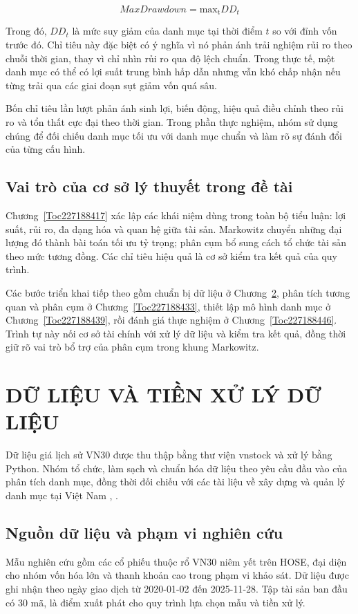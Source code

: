 \documentclass[12pt,a4paper,openany,oneside]{book}
\begin{document}
\begin{equation}\label{eq:theory-20}
Max Drawdown=\operatorname{{max_{t}}}D{D}_{t}
\end{equation}

Trong đó, \(D{D}_{t}\) là mức suy giảm của danh mục tại thời điểm \(t\) so với đỉnh vốn trước đó. Chỉ tiêu này đặc biệt có ý nghĩa vì nó phản ánh trải nghiệm rủi ro theo chuỗi thời gian, thay vì chỉ nhìn rủi ro qua độ lệch chuẩn. Trong thực tế, một danh mục có thể có lợi suất trung bình hấp dẫn nhưng vẫn khó chấp nhận nếu từng trải qua các giai đoạn sụt giảm vốn quá sâu.

Bốn chỉ tiêu lần lượt phản ánh sinh lợi, biến động, hiệu quả điều chỉnh theo rủi ro và tổn thất cực đại theo thời gian. Trong phần thực nghiệm, nhóm sử dụng chúng để đối chiếu danh mục tối ưu với danh mục chuẩn và làm rõ sự đánh đổi của từng cấu hình.

\section{Vai trò của cơ sở lý thuyết trong đề tài}\label{Toc227188425}
Chương~\ref{Toc227188417} xác lập các khái niệm dùng trong toàn bộ tiểu luận: lợi suất, rủi ro, đa dạng hóa và quan hệ giữa tài sản. Markowitz chuyển những đại lượng đó thành bài toán tối ưu tỷ trọng; phân cụm bổ sung cách tổ chức tài sản theo mức tương đồng. Các chỉ tiêu hiệu quả là cơ sở kiểm tra kết quả của quy trình.

Các bước triển khai tiếp theo gồm chuẩn bị dữ liệu ở Chương~\ref{Toc227188426}, phân tích tương quan và phân cụm ở Chương~\ref{Toc227188433}, thiết lập mô hình danh mục ở Chương~\ref{Toc227188439}, rồi đánh giá thực nghiệm ở Chương~\ref{Toc227188446}. Trình tự này nối cơ sở tài chính với xử lý dữ liệu và kiểm tra kết quả, đồng thời giữ rõ vai trò bổ trợ của phân cụm trong khung Markowitz.

\chapter{DỮ LIỆU VÀ TIỀN XỬ LÝ DỮ LIỆU}\label{Toc227188426}
Dữ liệu giá lịch sử VN30 được thu thập bằng thư viện vnstock và xử lý bằng Python. Nhóm tổ chức, làm sạch và chuẩn hóa dữ liệu theo yêu cầu đầu vào của phân tích danh mục, đồng thời đối chiếu với các tài liệu về xây dựng và quản lý danh mục tại Việt Nam \cite{ref01}, \cite{ref04}.

\section{Nguồn dữ liệu và phạm vi nghiên cứu}\label{Toc227188427}
Mẫu nghiên cứu gồm các cổ phiếu thuộc rổ VN30 niêm yết trên HOSE, đại diện cho nhóm vốn hóa lớn và thanh khoản cao trong phạm vi khảo sát. Dữ liệu được ghi nhận theo ngày giao dịch từ 2020-01-02 đến 2025-11-28. Tập tài sản ban đầu có 30 mã, là điểm xuất phát cho quy trình lựa chọn mẫu và tiền xử lý.
\end{document}

